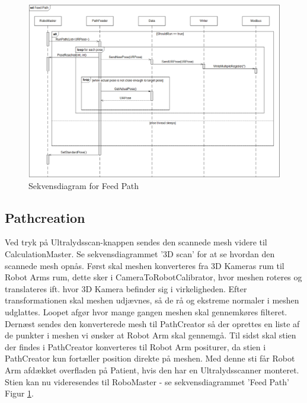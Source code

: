 \begin{figure}[H]
    \centering
    \includegraphics[width=1\textwidth]{figurer/d/Design/Sequence/sd_feedpath}
    \caption{Sekvensdiagram for Feed Path}
    \label{sd_feedpath}
\end{figure}

\subsection{Pathcreation}
Ved tryk på Ultralydsscan-knappen sendes den scannede mesh videre til CalculationMaster. Se sekvensdiagrammet '3D scan' for at se hvordan den scannede mesh opnås.
Først skal meshen konverteres fra 3D Kameras rum til Robot Arms rum, dette sker i CameraToRobotCalibrator, hvor meshen roteres og translateres ift. hvor 3D Kamera befinder sig i virkeligheden.
Efter transformationen skal meshen udjævnes, så de rå og ekstreme normaler i meshen udglattes. Loopet afgør hvor mange gangen meshen skal gennemkøres filteret.
Dernæst sendes den konverterede mesh til PathCreator så der oprettes en liste af de punkter i meshen vi ønsker at Robot Arm skal gennemgå.
Til sidst skal stien der findes i PathCreator konverteres til Robot Arm positurer, da stien i PathCreator kun fortæller position direkte på meshen.
Med denne sti får Robot Arm afdækket overfladen på Patient, hvis den har en Ultralydsscanner monteret.
Stien kan nu videresendes til RoboMaster - se sekvensdiagrammet 'Feed Path' Figur \ref{sd_feedpath}.

